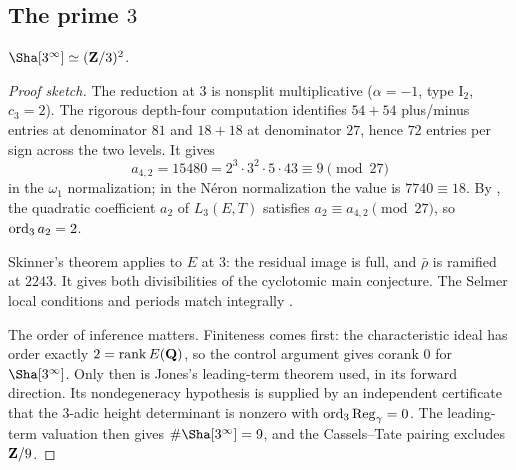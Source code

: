 \subsection[The prime 3]{The prime $3$}
\begin{theorem}\label{thm:sha3}
$\Sha[3^\infty]\simeq(\Z/3)^2$.
\end{theorem}
\begin{proof}[Proof sketch]
The reduction at $3$ is nonsplit multiplicative ($\alpha=-1$, type $\mathrm{I}_2$, $c_3=2$). The rigorous depth-four computation identifies $54+54$ plus/minus entries at denominator $81$ and $18+18$ at denominator $27$, hence $72$ entries per sign across the two levels. It gives
\[
a_{4,2}=15480=2^3\cdot3^2\cdot5\cdot43\equiv9\pmod{27}
\]
in the $\omega_1$ normalization; in the N\'eron normalization the value is $7740\equiv18$. By \cite[Prop.~3.5]{sw}, the quadratic coefficient $a_2$ of $L_3(E,T)$ satisfies $a_2\equiv a_{4,2}\pmod{27}$, so $\operatorname{ord}_3a_2=2$.

Skinner's theorem \cite[Thm.~A]{skinner} applies to $E$ at $3$: the residual image is full, and $\bar\rho$ is ramified at $2243$. It gives both divisibilities of the cyclotomic main conjecture. The Selmer local conditions and periods match integrally \cite{gv}.

The order of inference matters. Finiteness comes first: the characteristic ideal has order exactly $2=\operatorname{rank} E(\mathbf{Q})$, so the control argument gives corank $0$ for $\Sha[3^\infty]$. Only then is Jones's leading-term theorem \cite[Thm.~3.1]{jones} used, in its forward direction. Its nondegeneracy hypothesis is supplied by an independent certificate that the $3$-adic height determinant is nonzero with $\operatorname{ord}_3\operatorname{Reg}_\gamma=0$. The leading-term valuation then gives $\#\Sha[3^\infty]=9$, and the Cassels--Tate pairing excludes $\mathbf{Z}/9$.
\end{proof}

